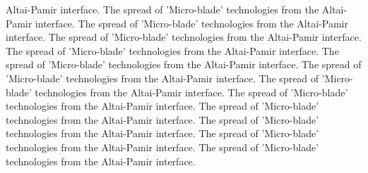 Altai-Pamir interface. The spread of 'Micro-blade' technologies from the Altai-Pamir interface. The spread of 'Micro-blade' technologies from the Altai-Pamir interface. The spread of 'Micro-blade' technologies from the Altai-Pamir interface. The spread of 'Micro-blade' technologies from the Altai-Pamir interface. The spread of 'Micro-blade' technologies from the Altai-Pamir interface. The spread of 'Micro-blade' technologies from the Altai-Pamir interface. The spread of 'Micro-blade' technologies from the Altai-Pamir interface. The spread of 'Micro-blade' technologies from the Altai-Pamir interface. The spread of 'Micro-blade' technologies from the Altai-Pamir interface. The spread of 'Micro-blade' technologies from the Altai-Pamir interface. The spread of 'Micro-blade' technologies from the Altai-Pamir interface. The spread of 'Micro-blade' technologies from the Altai-Pamir interface. 

